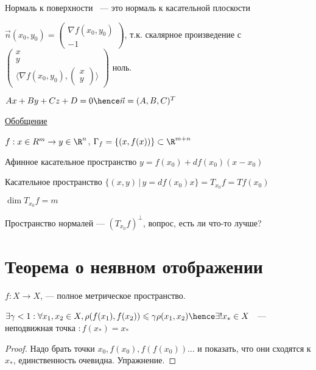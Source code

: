 \quad

\begin{definition}
    Нормаль к поверхности ~--- это нормаль к касательной плоскости
\end{definition}

$\vec{n} (x_0, y_0) = \begin{pmatrix}
    \nabla f(x_0, y_0)\\
    -1
\end{pmatrix}$, т.к. скалярное произведение с $\begin{pmatrix}
    x\\
    y\\
    \langle \nabla f(x_0, y_0) , \begin{pmatrix}
        x\\
        y
    \end{pmatrix}\rangle
\end{pmatrix}$ ноль.

\quad

$Ax + By + Cz + D = 0 \hence \vec{n} = (A, B, C)^{T}$

\quad

\underline{Обобщение}

$f : x \in R^ m \to y \in \R ^ n$, $\Gamma_f = \{ (x, f(x))\} \subset \R ^ {m + n}$

Афинное касательное пространство $y = f(x_0) + df(x_0)(x - x_0)$

Касательное пространство $\{ (x, y) \, | \, y = df(x_0) x \} = T_{x_0}f = Tf(x_0)$ 

$\dim T_{x_0}f = m$

Пространство нормалей --- $(T_{x_0} f) ^ {\perp}$, вопрос, есть ли что-то лучше?

\section{Теорема о неявном отображении}

\begin{theorem}
       $ f : X \to X$, --- полное метрическое пространство.

       $\exists \gamma < 1: \forall x_1, x_2 \in X, \rho(f(x_1), f(x_2)) \leqslant \gamma \rho(x_1, x_2) \hence \exists ! x_{*} \in X$  ~--- неподвижная точка $: f(x_*) = x_*$

\end{theorem}

\begin{proof}
    Надо брать точки $x_0, f(x_0), f(f(x_0)) \dots$ и показать, что они сходятся к $x_*$, единственность очевидна. Упражнение.
\end{proof}



